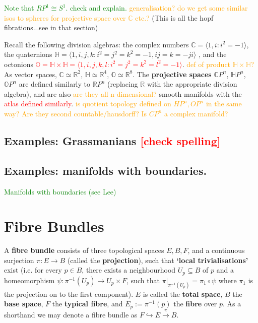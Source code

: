 \documentclass[a4paper]{article}
\theoremstyle{definition} \newtheorem*{definition}{Definition}
\theoremstyle{definition} \newtheorem*{definitions}{Definitions}
\theoremstyle{plain} \newtheorem{theorem}{Theorem}[section]
\theoremstyle{plain} \newtheorem{proposition}[theorem]{Proposition}
\theoremstyle{plain} \newtheorem{corollary}[theorem]{Corollary}
\theoremstyle{plain} \newtheorem{lemma}[theorem]{Lemma}
\theoremstyle{plain} \newtheorem{example}[theorem]{Example}
\newcommand{\checkCorrect}[1]{\textcolor{red}{#1}}
\newcommand{\question}[1]{\textcolor{orange}{#1}}
\newcommand{\finish}[1]{\textcolor{green}{#1}}
\newcommand{\defn}[1]{\textbf{#1}}
\newcommand{\realnos}{\mathbb{R}}
\newcommand{\complexnos}{\mathbb{C}}
\begin{document}
\finish{Note that $RP^1 \cong S^1$. check and explain.} \question{generalisation? do we get some similar isos to spheres for projective space over $\complexnos$ etc.?} (This is all the hopf fibrations...see in that section)

 Recall the following division algebras: the complex numbers $\complexnos = \langle 1, i: i^2=-1 \rangle$, the quaternions $\mathbb{H} = \langle 1, i, j, k: i^2=j^2=k^2=-1, ij=k=-ji \rangle$ , and the octonions \checkCorrect{$\mathbb{O} = \mathbb{H}\times \mathbb{H}=\langle 1, i, j, k, l: i^2=j^2=k^2=l^2=-1 \rangle$}. \question{def of product $\mathbb{H}\times \mathbb{H}$?} As vector spaces, $\complexnos \simeq \realnos^2$, $\mathbb{H} \simeq \realnos^4$, $\mathbb{O} \simeq \realnos^8$. The \defn{projective spaces} $\complexnos P^n$, $\mathbb{H} P^n$, $\mathbb{O} P^n$ are defined similarly to $\realnos P^n$ (replacing $\realnos$ with the appropriate division algebra), and are also \question{are they all n-dimensional?} smooth manifolds with the \checkCorrect{atlas defined similarly}.
\question{is quotient topology defined on $HP^n, OP^n$ in the same way? Are they second countable/hausdorff?}
\question{Is $CP^n$ a complex manifold?}

\subsection{Examples: Grassmanians \checkCorrect{[check spelling]}}


\subsection{Examples: manifolds with boundaries.}
\finish{Manifolds with boundaries (see Lee)}

\section{Fibre Bundles}

A \defn{fibre bundle} consists of three topological spaces $E, B, F$, and a continuous surjection $\pi:E\rightarrow B$ (called the \defn{projection}), such that \defn{`local trivialisations'} exist (i.e. for every $p\in B$, there exists a neighbourhood $U_p\subseteq B$ of $p$ and a homeomorphism $\psi: \pi^{-1}(U_p) \rightarrow U_p \times F$, such that $\pi \vert_{\pi^{-1}(U_p)} = \pi_1 \circ \psi$ where $\pi_1$ is the projection on to the first component). $E$ is called the \defn{total space}, $B$ the \defn{base space}, $F$ the \defn{typical fibre}, and $E_p:=\pi^{-1}(p)$ the \defn{fibre} over $p$. As a shorthand we may denote a fibre bundle as $F\hookrightarrow E\xrightarrow{\pi} B$.
\end{document}

